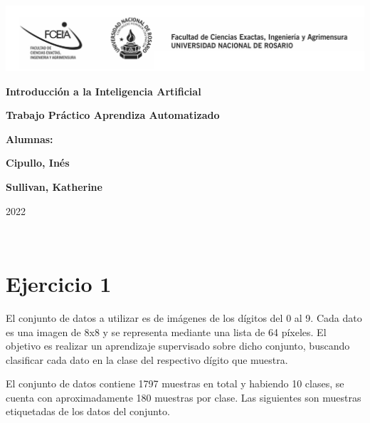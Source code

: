 \documentclass{article}
\begin{document}
\begin{titlepage}
    \hspace{-2.5cm}\includegraphics[scale= 0.48]{header.png}
    \begin{center}
        \vfill
            \noindent\textbf{\Huge Introducción a la Inteligencia Artificial}\par
            \vspace{.5cm}
            \noindent\textbf{\Huge Trabajo Práctico Aprendiza Automatizado}\par
            \vspace{.5cm}
        \vfill
        \noindent \textbf{\huge Alumnas:}\par
        \vspace{.5cm}
        \noindent \textbf{\Large Cipullo, Inés}\par
        \noindent \textbf{\Large Sullivan, Katherine}\par
 
        \vfill
        \noindent\large 2022
    \end{center}
\end{titlepage}
\ 



\section*{Ejercicio 1 }

El conjunto de datos a utilizar es de imágenes de los dígitos del 0 al 9. Cada dato es una imagen de 8x8 y se representa mediante una lista de 64 píxeles.
El objetivo es realizar un aprendizaje supervisado sobre dicho conjunto, buscando clasificar cada dato en la clase del respectivo dígito que muestra.

El conjunto de datos contiene 1797 muestras en total y habiendo 10 clases, se cuenta con aproximadamente 180 muestras por clase.
Las siguientes son muestras etiquetadas de los datos del conjunto.
\end{document}
